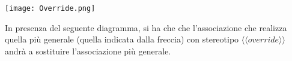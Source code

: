 
\begin{center}
    \texttt{[image: Override.png]}
\end{center}

\noindent
In presenza del seguente diagramma, si ha che che l'associazione che realizza quella più generale (quella indicata dalla freccia) con stereotipo $\langle\langle override \rangle\rangle$ andrà a sostituire l'associazione più generale.